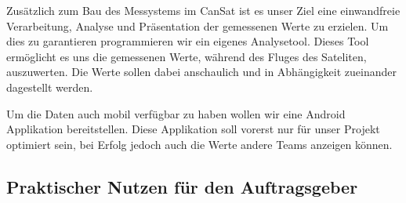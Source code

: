 Zusätzlich zum Bau des Messystems im CanSat ist es unser Ziel eine einwandfreie Verarbeitung, Analyse und Präsentation der gemessenen Werte zu erzielen. Um dies zu garantieren programmieren wir ein eigenes Analysetool. Dieses Tool ermöglicht es uns die gemessenen Werte, während des Fluges des Sateliten, auszuwerten. Die Werte sollen dabei anschaulich und in Abhängigkeit zueinander dagestellt werden.

Um die Daten auch mobil verfügbar zu haben wollen wir eine Android Applikation bereitstellen. Diese Applikation soll vorerst nur für unser Projekt optimiert sein, bei Erfolg jedoch auch die Werte andere Teams anzeigen können.

\subsection{Praktischer Nutzen für den Auftragsgeber}



